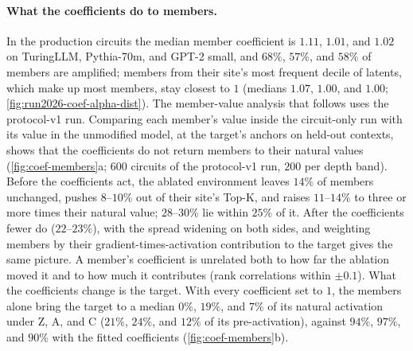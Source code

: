 \documentclass[10pt]{article}
\begin{document}
\paragraph{What the coefficients do to members.}
In the production circuits the median member coefficient is $1.11$, $1.01$, and $1.02$ on TuringLLM, Pythia-70m, and GPT-2 small, and $68\%$, $57\%$, and $58\%$ of members are amplified; members from their site's most frequent decile of latents, which make up most members, stay closest to $1$ (medians $1.07$, $1.00$, and $1.00$; \cref{fig:run2026-coef-alpha-dist}).
The member-value analysis that follows uses the protocol-v1 run.
Comparing each member's value inside the circuit-only run with its value in the unmodified model, at the target's anchors on held-out contexts, shows that the coefficients do not return members to their natural values (\cref{fig:coef-members}a; $600$ circuits of the protocol-v1 run, $200$ per depth band).
Before the coefficients act, the ablated environment leaves $14\%$ of members unchanged, pushes $8$--$10\%$ out of their site's Top-K, and raises $11$--$14\%$ to three or more times their natural value; $28$--$30\%$ lie within $25\%$ of it.
After the coefficients fewer do ($22$--$23\%$), with the spread widening on both sides, and weighting members by their gradient-times-activation contribution to the target gives the same picture.
A member's coefficient is unrelated both to how far the ablation moved it and to how much it contributes (rank correlations within $\pm 0.1$).
What the coefficients change is the target.
With every coefficient set to $1$, the members alone bring the target to a median $0\%$, $19\%$, and $7\%$ of its natural activation under Z, A, and C ($21\%$, $24\%$, and $12\%$ of its pre-activation), against $94\%$, $97\%$, and $90\%$ with the fitted coefficients (\cref{fig:coef-members}b).
\end{document}
